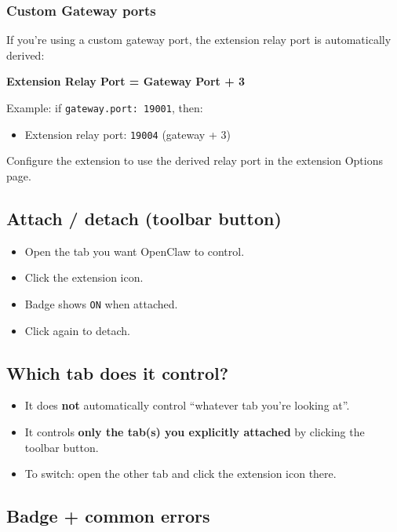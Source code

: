 \subsubsection{Custom Gateway ports}


If you're using a custom gateway port, the extension relay port is automatically derived:

\textbf{Extension Relay Port = Gateway Port + 3}

Example: if \texttt{gateway.port: 19001}, then:

\begin{itemize}
  \item Extension relay port: \texttt{19004} (gateway + 3)
\end{itemize}


Configure the extension to use the derived relay port in the extension Options page.

\subsection{Attach / detach (toolbar button)}


\begin{itemize}
  \item Open the tab you want OpenClaw to control.
  \item Click the extension icon.
  \item Badge shows \texttt{ON} when attached.
  \item Click again to detach.
\end{itemize}


\subsection{Which tab does it control?}


\begin{itemize}
  \item It does \textbf{not} automatically control “whatever tab you’re looking at”.
  \item It controls \textbf{only the tab(s) you explicitly attached} by clicking the toolbar button.
  \item To switch: open the other tab and click the extension icon there.
\end{itemize}


\subsection{Badge + common errors}


